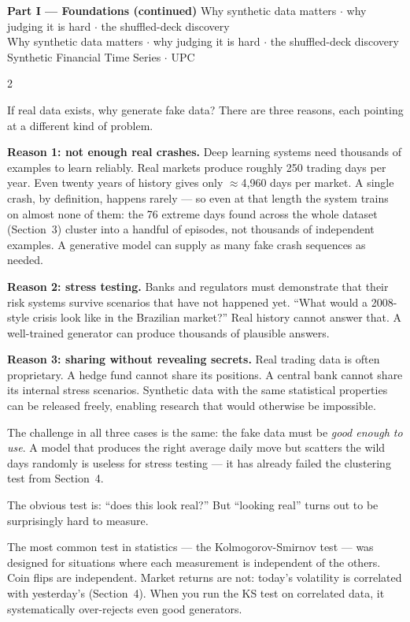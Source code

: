 \documentclass[10pt]{article}
\newcommand{\skybox}[2]{\begin{tcolorbox}[mybox={Sky}{BBg},title={#1}]#2\end{tcolorbox}}
\newcommand{\pagehead}[2]{%
  \begin{tcolorbox}[enhanced,arc=0pt,outer arc=0pt,boxrule=0pt,
    colback=Navy,colframe=Navy,
    top=5pt,bottom=5pt,left=8pt,right=8pt,
    before skip=0pt,after skip=10pt]
  {\color{white}\large\bfseries #1}%
  \ifx\relax#2\relax\else\\[1pt]{\color{blue!30!white}\small #2}\fi
  \hfill{\color{blue!20!white}\footnotesize Synthetic Financial Time Series $\cdot$ UPC}
  \end{tcolorbox}}
\begin{document}
\clearpage

\pagehead{Part I --- Foundations (continued)}
         {Why synthetic data matters $\cdot$ why judging it is hard $\cdot$ the shuffled-deck discovery}

\begin{multicols}{2}

\skybox{5\quad Why Anyone Wants Synthetic Markets}{%
If real data exists, why generate fake data? There are three reasons, each pointing at a different kind of problem.

\medskip
\textbf{Reason 1: not enough real crashes.} Deep learning systems need thousands of examples to learn reliably. Real markets produce roughly 250 trading days per year. Even twenty years of history gives only $\approx$4{,}960 days per market. A single crash, by definition, happens rarely --- so even at that length the system trains on almost none of them: the 76 extreme days found across the whole dataset (Section~3) cluster into a handful of episodes, not thousands of independent examples. A generative model can supply as many fake crash sequences as needed.

\medskip
\textbf{Reason 2: stress testing.} Banks and regulators must demonstrate that their risk systems survive scenarios that have not happened yet. ``What would a 2008-style crisis look like in the Brazilian market?'' Real history cannot answer that. A well-trained generator can produce thousands of plausible answers.

\medskip
\textbf{Reason 3: sharing without revealing secrets.} Real trading data is often proprietary. A hedge fund cannot share its positions. A central bank cannot share its internal stress scenarios. Synthetic data with the same statistical properties can be released freely, enabling research that would otherwise be impossible.

\smallskip
The challenge in all three cases is the same: the fake data must be \emph{good enough to use}. A model that produces the right average daily move but scatters the wild days randomly is useless for stress testing --- it has already failed the clustering test from Section~4.}

\skybox{6\quad Why Judging It Is Hard}{%
The obvious test is: ``does this look real?'' But ``looking real'' turns out to be surprisingly hard to measure.

The most common test in statistics --- the Kolmogorov-Smirnov test --- was designed for situations where each measurement is independent of the others. Coin flips are independent. Market returns are not: today's volatility is correlated with yesterday's (Section~4). When you run the KS test on correlated data, it systematically over-rejects even good generators.

}
\end{multicols}
\end{document}

